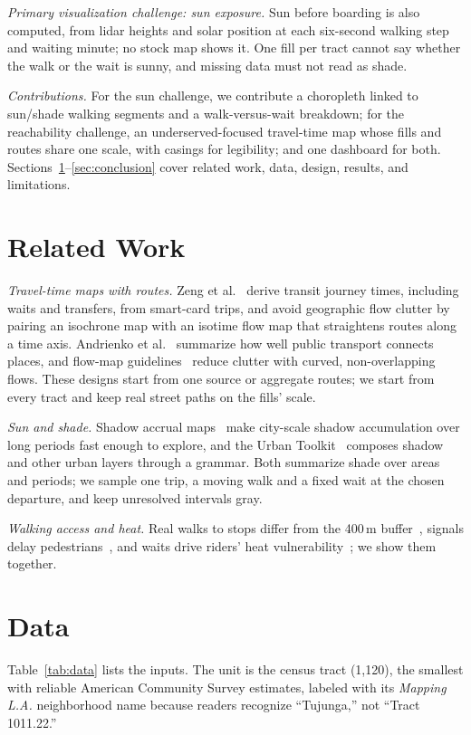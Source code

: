 \documentclass[runningheads,a4paper]{llncs}
\begin{document}
\emph{Primary visualization challenge: sun exposure.} Sun before boarding is also computed, from lidar heights and solar position at each six-second walking step and waiting minute; no stock map shows it. One fill per tract cannot say whether the walk or the wait is sunny, and missing data must not read as shade.

\emph{Contributions.} For the sun challenge, we contribute a choropleth linked to sun/shade walking segments and a walk-versus-wait breakdown; for the reachability challenge, an underserved-focused travel-time map whose fills and routes share one scale, with casings for legibility; and one dashboard for both. Sections~\ref{sec:related}--\ref{sec:conclusion} cover related work, data, design, results, and limitations.

\section{Related Work}\label{sec:related}
\emph{Travel-time maps with routes.} Zeng et al.~\cite{zeng2014} derive transit journey times, including waits and transfers, from smart-card trips, and avoid geographic flow clutter by pairing an isochrone map with an isotime flow map that straightens routes along a time axis. Andrienko et al.~\cite{andrienko2020} summarize how well public transport connects places, and flow-map guidelines~\cite{jenny2018} reduce clutter with curved, non-overlapping flows. These designs start from one source or aggregate routes; we start from every tract and keep real street paths on the fills' scale.

\emph{Sun and shade.} Shadow accrual maps~\cite{miranda2019} make city-scale shadow accumulation over long periods fast enough to explore, and the Urban Toolkit~\cite{moreira2024} composes shadow and other urban layers through a grammar. Both summarize shade over areas and periods; we sample one trip, a moving walk and a fixed wait at the chosen departure, and keep unresolved intervals gray.

\emph{Walking access and heat.} Real walks to stops differ from the 400\,m buffer~\cite{elgeneidy2014}, signals delay pedestrians~\cite{marisamynathan2018}, and waits drive riders' heat vulnerability~\cite{fraser2017}; we show them together.

\section{Data}\label{sec:data}
Table~\ref{tab:data} lists the inputs. The unit is the census tract (1,120), the smallest with reliable American Community Survey estimates, labeled with its \emph{Mapping L.A.} neighborhood name because readers recognize ``Tujunga,'' not ``Tract 1011.22.''
\end{document}
